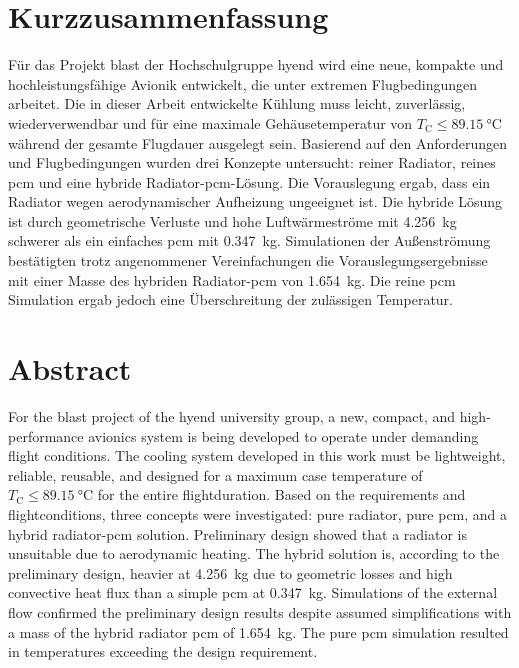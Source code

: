 \chapter*{Kurzzusammenfassung} %
\label{chap:Kurzzusammenfassung}


Für das Projekt \ac{blast} der Hochschulgruppe \ac{hyend} wird eine neue, kompakte und hochleistungsfähige Avionik entwickelt,
die unter extremen Flugbedingungen arbeitet. Die in dieser Arbeit entwickelte Kühlung muss leicht, zuverlässig, wiederverwendbar und für eine
maximale Gehäusetemperatur von $T_\mathrm{C} \leq \SI{89.15}{\celsius}$ während der gesamte Flugdauer ausgelegt sein.
Basierend auf den Anforderungen und Flugbedingungen
wurden drei Konzepte untersucht: reiner Radiator, reines \ac{pcm} und eine hybride Radiator-\ac{pcm}-Lösung. Die Vorauslegung
ergab, dass ein Radiator wegen aerodynamischer Aufheizung ungeeignet ist. Die hybride Lösung ist durch geometrische
Verluste und hohe Luftwärmeströme mit \SI{4.256}{\kilogram} schwerer als ein einfaches \ac{pcm}
mit \SI{0.347}{\kilogram}. Simulationen der Außenströmung
bestätigten trotz angenommener Vereinfachungen die Vorauslegungsergebnisse mit einer Masse des hybriden Radiator-\ac{pcm} von \SI{1.654}{\kilogram}.
Die reine \ac{pcm} Simulation ergab jedoch eine Überschreitung der zulässigen Temperatur.

\chapter*{Abstract} %
\label{chap:Abstract}
For the \ac{blast} project of the \ac{hyend} university group, a new, compact, and high-performance avionics system is being developed to
operate under demanding flight conditions. The cooling system developed in this work must be lightweight, reliable, reusable, and designed for a maximum
case temperature of $T_\mathrm{C} \leq \SI{89.15}{\celsius}$ for the entire flightduration.
Based on the requirements and flightconditions, three concepts were investigated: pure radiator, pure \ac{pcm}, and a hybrid radiator-\ac{pcm}
solution. Preliminary design showed that a radiator is unsuitable due to aerodynamic heating. The hybrid solution is, according to
the preliminary design, heavier at \SI{4.256}{\kilogram} due to geometric losses and high convective heat flux than a simple \ac{pcm} at
\SI{0.347}{\kilogram}. Simulations of the external flow confirmed the preliminary design results despite assumed
simplifications with a mass of the hybrid radiator \ac{pcm} of \SI{1.654}{\kilogram}. The pure \ac{pcm} simulation resulted in temperatures
exceeding the design requirement.